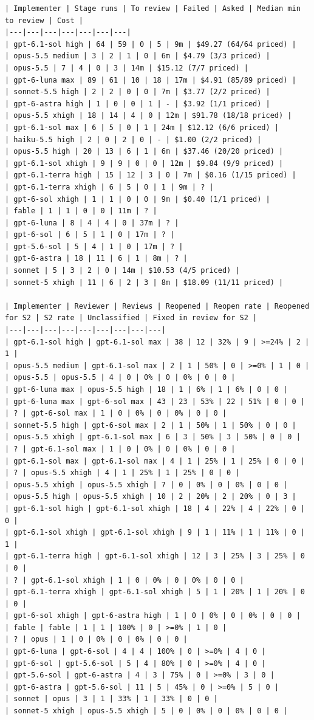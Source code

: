 \documentclass[11pt,a4paper]{article}
\begin{document}
{\tiny
\begin{verbatim}
| Implementer | Stage runs | To review | Failed | Asked | Median min to review | Cost |
|---|---|---|---|---|---|---|
| gpt-6.1-sol high | 64 | 59 | 0 | 5 | 9m | $49.27 (64/64 priced) |
| opus-5.5 medium | 3 | 2 | 1 | 0 | 6m | $4.79 (3/3 priced) |
| opus-5.5 | 7 | 4 | 0 | 3 | 14m | $15.12 (7/7 priced) |
| gpt-6-luna max | 89 | 61 | 10 | 18 | 17m | $4.91 (85/89 priced) |
| sonnet-5.5 high | 2 | 2 | 0 | 0 | 7m | $3.77 (2/2 priced) |
| gpt-6-astra high | 1 | 0 | 0 | 1 | - | $3.92 (1/1 priced) |
| opus-5.5 xhigh | 18 | 14 | 4 | 0 | 12m | $91.78 (18/18 priced) |
| gpt-6.1-sol max | 6 | 5 | 0 | 1 | 24m | $12.12 (6/6 priced) |
| haiku-5.5 high | 2 | 0 | 2 | 0 | - | $1.00 (2/2 priced) |
| opus-5.5 high | 20 | 13 | 6 | 1 | 6m | $37.46 (20/20 priced) |
| gpt-6.1-sol xhigh | 9 | 9 | 0 | 0 | 12m | $9.84 (9/9 priced) |
| gpt-6.1-terra high | 15 | 12 | 3 | 0 | 7m | $0.16 (1/15 priced) |
| gpt-6.1-terra xhigh | 6 | 5 | 0 | 1 | 9m | ? |
| gpt-6-sol xhigh | 1 | 1 | 0 | 0 | 9m | $0.40 (1/1 priced) |
| fable | 1 | 1 | 0 | 0 | 11m | ? |
| gpt-6-luna | 8 | 4 | 4 | 0 | 37m | ? |
| gpt-6-sol | 6 | 5 | 1 | 0 | 17m | ? |
| gpt-5.6-sol | 5 | 4 | 1 | 0 | 17m | ? |
| gpt-6-astra | 18 | 11 | 6 | 1 | 8m | ? |
| sonnet | 5 | 3 | 2 | 0 | 14m | $10.53 (4/5 priced) |
| sonnet-5 xhigh | 11 | 6 | 2 | 3 | 8m | $18.09 (11/11 priced) |

| Implementer | Reviewer | Reviews | Reopened | Reopen rate | Reopened for S2 | S2 rate | Unclassified | Fixed in review for S2 |
|---|---|---|---|---|---|---|---|---|
| gpt-6.1-sol high | gpt-6.1-sol max | 38 | 12 | 32% | 9 | >=24% | 2 | 1 |
| opus-5.5 medium | gpt-6.1-sol max | 2 | 1 | 50% | 0 | >=0% | 1 | 0 |
| opus-5.5 | opus-5.5 | 4 | 0 | 0% | 0 | 0% | 0 | 0 |
| gpt-6-luna max | opus-5.5 high | 18 | 1 | 6% | 1 | 6% | 0 | 0 |
| gpt-6-luna max | gpt-6-sol max | 43 | 23 | 53% | 22 | 51% | 0 | 0 |
| ? | gpt-6-sol max | 1 | 0 | 0% | 0 | 0% | 0 | 0 |
| sonnet-5.5 high | gpt-6-sol max | 2 | 1 | 50% | 1 | 50% | 0 | 0 |
| opus-5.5 xhigh | gpt-6.1-sol max | 6 | 3 | 50% | 3 | 50% | 0 | 0 |
| ? | gpt-6.1-sol max | 1 | 0 | 0% | 0 | 0% | 0 | 0 |
| gpt-6.1-sol max | gpt-6.1-sol max | 4 | 1 | 25% | 1 | 25% | 0 | 0 |
| ? | opus-5.5 xhigh | 4 | 1 | 25% | 1 | 25% | 0 | 0 |
| opus-5.5 xhigh | opus-5.5 xhigh | 7 | 0 | 0% | 0 | 0% | 0 | 0 |
| opus-5.5 high | opus-5.5 xhigh | 10 | 2 | 20% | 2 | 20% | 0 | 3 |
| gpt-6.1-sol high | gpt-6.1-sol xhigh | 18 | 4 | 22% | 4 | 22% | 0 | 0 |
| gpt-6.1-sol xhigh | gpt-6.1-sol xhigh | 9 | 1 | 11% | 1 | 11% | 0 | 1 |
| gpt-6.1-terra high | gpt-6.1-sol xhigh | 12 | 3 | 25% | 3 | 25% | 0 | 0 |
| ? | gpt-6.1-sol xhigh | 1 | 0 | 0% | 0 | 0% | 0 | 0 |
| gpt-6.1-terra xhigh | gpt-6.1-sol xhigh | 5 | 1 | 20% | 1 | 20% | 0 | 0 |
| gpt-6-sol xhigh | gpt-6-astra high | 1 | 0 | 0% | 0 | 0% | 0 | 0 |
| fable | fable | 1 | 1 | 100% | 0 | >=0% | 1 | 0 |
| ? | opus | 1 | 0 | 0% | 0 | 0% | 0 | 0 |
| gpt-6-luna | gpt-6-sol | 4 | 4 | 100% | 0 | >=0% | 4 | 0 |
| gpt-6-sol | gpt-5.6-sol | 5 | 4 | 80% | 0 | >=0% | 4 | 0 |
| gpt-5.6-sol | gpt-6-astra | 4 | 3 | 75% | 0 | >=0% | 3 | 0 |
| gpt-6-astra | gpt-5.6-sol | 11 | 5 | 45% | 0 | >=0% | 5 | 0 |
| sonnet | opus | 3 | 1 | 33% | 1 | 33% | 0 | 0 |
| sonnet-5 xhigh | opus-5.5 xhigh | 5 | 0 | 0% | 0 | 0% | 0 | 0 |


\end{verbatim}}
\end{document}
